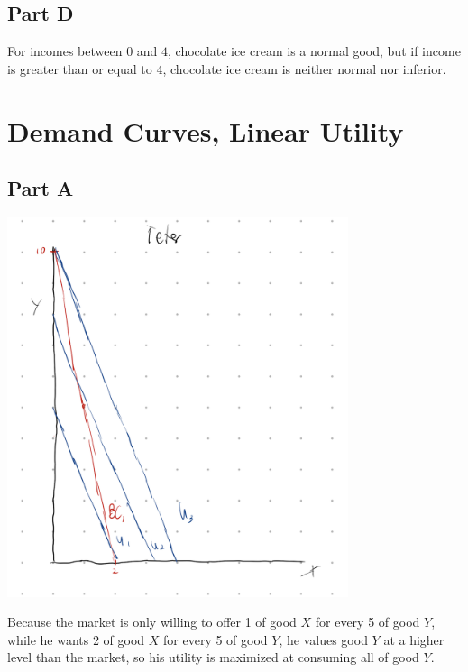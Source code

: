 \documentclass[8pt]{extarticle}
\begin{document}
{\subsection*{Part D}
For incomes between $0$ and $4$, chocolate ice cream is a normal good, but if income is greater than or equal to $4$, chocolate ice cream is neither normal nor inferior.
\section*{Demand Curves, Linear Utility}
\subsection*{Part A}
\begin{center}
	\includegraphics[width=10cm]{HW4Q7A}
\end{center}
Because the market is only willing to offer 1 of good $X$ for every 5 of good $Y$, while he wants 2 of good $X$ for every 5 of good $Y$, he values good $Y$ at a higher level than the market, so his utility is maximized at consuming all of good $Y$.
}
\end{document}
